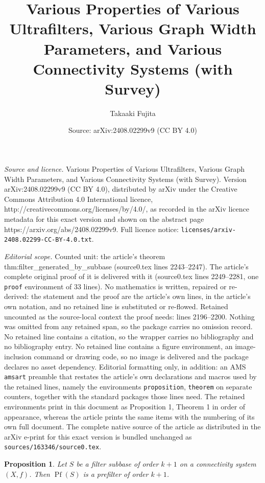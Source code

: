 \documentclass[10pt,a4paper]{amsart}
\title{Various Properties of Various Ultrafilters, Various Graph Width Parameters, and Various Connectivity Systems (with Survey)}
\author{Takaaki Fujita}
\date{Source: arXiv:2408.02299v9 (CC BY 4.0)}
\newtheorem{proposition}{Proposition}
\begin{document}
\maketitle

\noindent\emph{Source and licence.} Various Properties of Various Ultrafilters, Various Graph Width Parameters, and Various Connectivity Systems (with Survey). Version arXiv:2408.02299v9 (CC BY 4.0), distributed by arXiv under the Creative Commons Attribution 4.0 International licence, http://creativecommons.org/licenses/by/4.0/, as recorded in the arXiv licence metadata for this exact version and shown on the abstract page https://arxiv.org/abs/2408.02299v9. Full licence notice: \texttt{licenses/arxiv-2408.02299-CC-BY-4.0.txt}.\par\smallskip

\noindent\textit{Editorial scope.} Counted unit: the article's theorem thm:filter\_generated\_by\_subbase (source0.tex lines 2243--2247). The article's complete original proof of it is delivered with it (source0.tex lines 2249--2281, one \texttt{proof} environment of 33 lines). No mathematics is written, repaired or re-derived: the statement and the proof are the article's own lines, in the article's own notation, and no retained line is substituted or re-flowed.  Retained uncounted as the source-local context the proof needs: lines 2196--2200.  Nothing was omitted from any retained span, so the package carries no omission record.  No retained line contains a citation, so the wrapper carries no bibliography and no bibliography entry.  No retained line contains a figure environment, an image-inclusion command or drawing code, so no image is delivered and the package declares no asset dependency.  Editorial formatting only, in addition: an AMS \texttt{amsart} preamble that restates the article's own declarations and macros used by the retained lines, namely the environments \texttt{proposition}, \texttt{theorem} on separate counters, together with the standard packages those lines need.  The retained environments print in this document as Proposition 1, Theorem 1 in order of appearance, whereas the article prints the same items with the numbering of its own full document.  The complete native source of the article as distributed in the arXiv e-print for this exact version is bundled unchanged as \texttt{sources/163346/source0.tex}.
\begin{proposition}
\label{thm:prefilter_generated_by_subbase}
Let \(S\) be a filter subbase of order \(k+1\) on a connectivity system \((X,f)\).
Then \(\operatorname{Pf}(S)\) is a prefilter of order \(k+1\).
\end{proposition}
\end{document}
